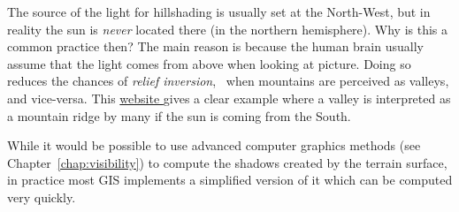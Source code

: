 \begin{floatbox}
  \begin{kaobox-practice}[frametitle=\faCog\ Why does the sunlight come from the North-West?]
    The source of the light for hillshading is usually set at the North-West, but in reality the sun is \emph{never} located there (in the northern hemisphere).
    Why is this a common practice then?
    The main reason is because the human brain usually assume that the light comes from above when looking at picture.
    Doing so reduces the chances of \emph{relief inversion}, \ie\ when mountains are perceived as valleys, and vice-versa.
    This \href{https://ramblemaps.com/why-does-sunlight-come-from-north}{website \faExternalLink} gives a clear example where a valley is interpreted as a mountain ridge by many if the sun is coming from the South.
  \end{kaobox-practice}
\end{floatbox}

While it would be possible to use advanced computer graphics methods (see Chapter~\ref{chap:visibility}) to compute the shadows created by the terrain surface, in practice most GIS implements a simplified version of it which can be computed very quickly.

